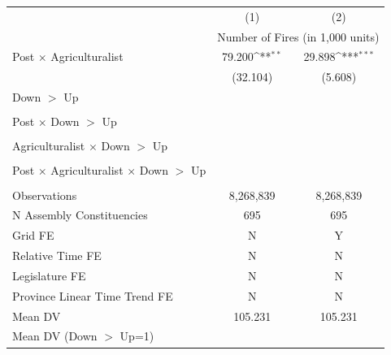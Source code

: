 {
\def\sym#1{\ifmmode^{#1}\else\(^{#1}\)\fi}
\begin{tabular}{l*{2}{c}}
\hline
            &\multicolumn{1}{c}{(1)}         &\multicolumn{1}{c}{(2)}         \\
            & \multicolumn{2}{c}{Number of Fires (in 1,000 units)} \\ \hline

Post $\times$ Agriculturalist&      79.200\sym{**} &      29.898\sym{***}\\
            &    (32.104)         &     (5.608)         \\
Down $>$ Up &                     &                     \\
            &                     &                     \\
Post $\times$ Down $>$ Up&                     &                     \\
            &                     &                     \\
Agriculturalist $\times$ Down $>$ Up&                     &                     \\
            &                     &                     \\
Post $\times$ Agriculturalist $\times$ Down $>$ Up&                     &                     \\
            &                     &                     \\
\hline
Observations&   8,268,839         &   8,268,839         \\
N Assembly Constituencies&         695         &         695         \\
Grid FE     &           N         &           Y         \\
Relative Time FE&           N         &           N         \\
Legislature FE&           N         &           N         \\
Province Linear Time Trend FE&           N         &           N         \\
Mean DV     &     105.231         &     105.231         \\
Mean DV (Down $>$ Up=1)&                     &                     \\
\hline
\end{tabular}
}
